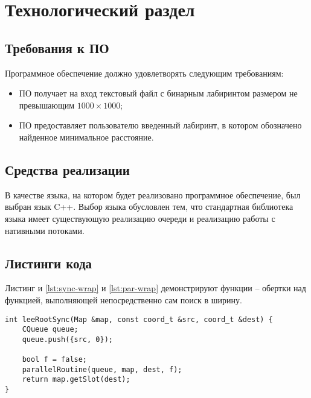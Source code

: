 \chapter{Технологический раздел}\label{sec:impl}

\section{Требования к ПО}

Программное обеспечение должно удовлетворять следующим требованиям:
\begin{itemize}
	\item ПО получает на вход текстовый файл с бинарным лабиринтом размером не превышающим $1000 \times 1000$;
	\item ПО предоставляет пользователю введенный лабиринт, в котором обозначено найденное минимальное расстояние.
\end{itemize}

\section{Средства реализации} 
В качестве языка, на котором будет реализовано программное обеспечение, был выбран язык C++. Выбор языка обусловлен тем, что стандартная библиотека языка имеет существующую реализацию очереди\cite{queue++} и реализацию работы с нативными потоками\cite{threads++}.
\section{Листинги кода}
Листинг и \ref{lst:sync-wrap} и \ref{lst:par-wrap} демонстрируют функции -- обертки над функцией, выполняющей непосредственно сам поиск в ширину. 
\captionsetup{singlelinecheck = false, justification=raggedright}
\begin{lstlisting}[label=lst:sync-wrap,caption=функция - обретка синхронного алгоритма Ли]
int leeRootSync(Map &map, const coord_t &src, coord_t &dest) {
	CQueue queue;
	queue.push({src, 0});
	
	bool f = false;
	parallelRoutine(queue, map, dest, f);
	return map.getSlot(dest);
}
\end{lstlisting}

